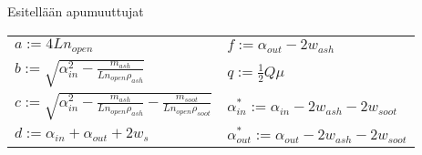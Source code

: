 



Esitellään apumuuttujat
\begin{center}
\begin{tabular}{ll}
    \( a := 4 L n_{open} \) & \( f := \alpha_{out} - 2 w_{ash} \) \\
    \( b := \sqrt{\alpha_{in}^2 - \frac{m_{ash}}{L n_{open} \rho_{ash}}} \) & \( q := \frac{1}{2} Q \mu \) \\
    \( c := \sqrt{\alpha_{in}^2 - \frac{m_{ash}}{L n_{open} \rho_{ash}} - \frac{m_{soot}}{L n_{open} \rho_{soot}}} \) & \( \alpha_{in}^* := \alpha_{in} - 2 w_{ash} - 2 w_{soot} \) \\
    \( d := \alpha_{in} + \alpha_{out} + 2w_s \) & \( \alpha_{out}^* := \alpha_{out} - 2 w_{ash} - 2 w_{soot} \)
\end{tabular}
\end{center}


